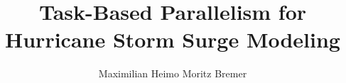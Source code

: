 \documentclass[12pt]{report}
\title{Task-Based Parallelism for Hurricane Storm Surge Modeling}
\author{Maximilian Heimo Moritz Bremer}
\begin{document}






\newpage

\begin{singlespacing}
\tableofcontents
\end{singlespacing}
\newpage
{} 







\singlespacing%

%
\end{document}
